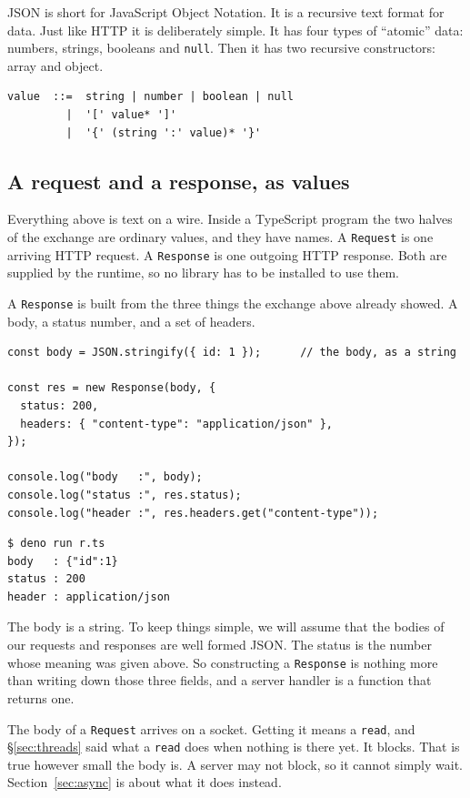 \documentclass[11pt,a4paper]{article}
\begin{document}
JSON is short for JavaScript Object Notation. It is a recursive text format for data. Just like
HTTP it is deliberately simple. It has four types of ``atomic'' data: numbers, strings, booleans
and \texttt{null}. Then it has two recursive constructors: array and object.

\begin{lstlisting}
value  ::=  string | number | boolean | null
         |  '[' value* ']'
         |  '{' (string ':' value)* '}'
\end{lstlisting}

\subsection{A request and a response, as values}
\label{sec:respval}

Everything above is text on a wire. Inside a TypeScript program the two halves of the exchange are
ordinary values, and they have names. A \texttt{Request} is one arriving HTTP request. A
\texttt{Response} is one outgoing HTTP response. Both are supplied by the runtime, so no library has to be installed to use them.

A \texttt{Response} is built from the three things the exchange above already showed. A body, a
status number, and a set of headers.

\begin{lstlisting}[language=TS]
const body = JSON.stringify({ id: 1 });      // the body, as a string

const res = new Response(body, {
  status: 200,
  headers: { "content-type": "application/json" },
});

console.log("body   :", body);
console.log("status :", res.status);
console.log("header :", res.headers.get("content-type"));
\end{lstlisting}

\begin{lstlisting}[language=SH]
$ deno run r.ts
body   : {"id":1}
status : 200
header : application/json
\end{lstlisting}

The body is a string. To keep things simple, we will assume that the bodies of our requests and
responses are well formed JSON. The status is the number whose meaning was given above. So constructing a
\texttt{Response} is nothing more than writing down those three fields, and a server handler is a
function that returns one.

The body of a \texttt{Request} arrives on a socket. Getting it means a \texttt{read}, and
\S\ref{sec:threads} said what a \texttt{read} does when nothing is there yet. It blocks. That is
true however small the body is. A server may not block, so it cannot simply wait.
Section~\ref{sec:async} is about what it does instead.
\end{document}
